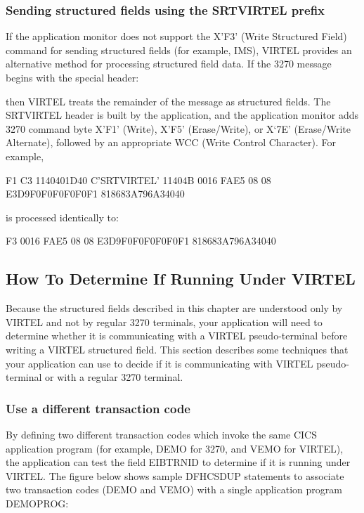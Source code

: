 \documentclass[letterpaper,10pt,english]{sphinxmanual}
\begin{document}
\subsubsection{Sending structured fields using the SRTVIRTEL prefix}
\label{\detokenize{User_Guide:sending-structured-fields-using-the-srtvirtel-prefix}}
If the application monitor does not support the X’F3’ (Write Structured Field) command for sending structured fields
(for example, IMS), VIRTEL provides an alternative method for processing structured field data. If the 3270 message
begins with the special header:

\begin{sphinxVerbatim}[commandchars=\\\{\}]
\end{sphinxVerbatim}

then VIRTEL treats the remainder of the message as structured fields.
The SRTVIRTEL header is built by the application, and the application monitor adds 3270 command byte X’F1’ (Write),
X’F5’ (Erase/Write), or X‘7E’ (Erase/Write Alternate), followed by an appropriate WCC (Write Control Character).
For example,

F1 C3 1140401D40 C’SRTVIRTEL’ 11404B 0016 FAE5 08 08 E3D9F0F0F0F0F0F1 818683A796A34040

is processed identically to:

F3 0016 FAE5 08 08 E3D9F0F0F0F0F0F1 818683A796A34040


\subsection{How To Determine If Running Under VIRTEL}
\label{\detokenize{User_Guide:how-to-determine-if-running-under-virtel}}
Because the structured fields described in this chapter are understood only by VIRTEL and not by regular 3270
terminals, your application will need to determine whether it is communicating with a VIRTEL pseudo-terminal before
writing a VIRTEL structured field. This section describes some techniques that your application can use to decide if it is
communicating with VIRTEL pseudo-terminal or with a regular 3270 terminal.


\subsubsection{Use a different transaction code}
\label{\detokenize{User_Guide:use-a-different-transaction-code}}
By defining two different transaction codes which invoke the same CICS application program (for example, DEMO for
3270, and VEMO for VIRTEL), the application can test the field EIBTRNID to determine if it is running under VIRTEL.
The figure below shows sample DFHCSDUP statements to associate two transaction codes (DEMO and VEMO) with a
single application program DEMOPROG:
\end{document}
